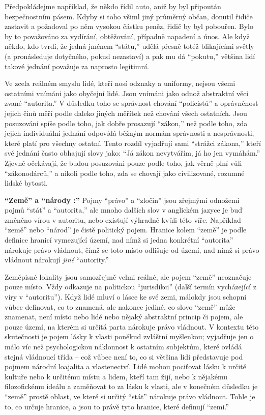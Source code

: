 \documentclass{book}
\begin{document}
Předpokládejme například, že někdo řídil auto, aniž by byl připoután bezpečnostním pásem. Kdyby si toho všiml jiný průměrný občan, donutil řidiče zastavit a požadoval po něm vysokou částku peněz, řidič by byl pobouřen. Bylo by to považováno za vydírání, obtěžování, případně napadení a únos. Ale když někdo, kdo tvrdí, že jedná jménem \enquote{státu,} udělá přesně totéž blikajícími světly (a pronásleduje dotyčného, pokud nezastaví) a pak mu dá \enquote{pokutu,} většina lidí takové jednání považuje za naprosto legitimní.

Ve zcela reálném smyslu lidé, kteří nosí odznaky a uniformy, nejsou všemi ostatními vnímáni jako obyčejní lidé. Jsou vnímáni jako odnož abstraktní věci zvané \enquote{autorita.} V důsledku toho se správnost chování \enquote{policistů} a oprávněnost jejich činů měří podle daleko jiných měřítek než chování všech ostatních. Jsou posuzováni spíše podle toho, jak dobře prosazují \enquote{zákon,} než podle toho, zda jejich individuální jednání odpovídá běžným normám správnosti a nesprávnosti, které platí pro všechny ostatní. Tento rozdíl vyjadřují sami \enquote{strážci zákona,} kteří své jednání často obhajují slovy jako: \enquote{Já zákon nevytvářím, já ho jen vymáhám.} Zjevně očekávají, že budou posuzováni pouze podle toho, jak věrně plní vůli \enquote{zákonodárců,} a nikoli podle toho, zda se chovají jako civilizované, rozumné lidské bytosti.

\textbf{\enquote{Země} a \enquote{národy :}} Pojmy \enquote{právo} a \enquote{zločin} jsou zřejmými odnožemi pojmů \enquote{stát} a \enquote{autorita,} ale mnoho dalších slov v anglickém jazyce je buď změněno vírou v autoritu, nebo existují výhradně kvůli této víře. Například \enquote{země} nebo \enquote{národ} je čistě politický pojem. Hranice kolem \enquote{země} je podle definice hranicí vymezující území, nad nímž si jedna konkrétní \enquote{autorita} nárokuje právo vládnout, čímž se toto místo odlišuje od území, nad nímž si právo vládnout nárokují \emph{jiné} \enquote{autority.}

Zeměpisné lokality jsou samozřejmě velmi reálné, ale pojem \enquote{země} neoznačuje pouze místo. Vždy odkazuje na politickou \enquote{jurisdikci} (další termín vycházející z víry v \enquote{autoritu}). Když lidé mluví o lásce ke své zemi, málokdy jsou schopni vůbec definovat, co to znamená, ale nakonec jediné, co slovo \enquote{země} může znamenat, není místo nebo lidé nebo nějaký abstraktní princip či pojem, ale pouze území, na kterém si určitá parta nárokuje právo vládnout. V kontextu této skutečnosti je pojem lásky k vlasti poněkud zvláštní myšlenkou; vyjadřuje jen o málo víc než psychologickou náklonnost k ostatním subjektům, které ovládá stejná vládnoucí třída -- což vůbec není to, co si většina lidí představuje pod pojmem národní loajalita a vlastenectví. Lidé mohou pociťovat lásku k určité kultuře nebo k určitému místu a lidem, kteří tam žijí, nebo k nějakému filozofickému ideálu a zaměňovat to za lásku k vlasti, ale v konečném důsledku je \enquote{země} prostě oblast, ve které si určitý \enquote{stát} nárokuje právo vládnout. Tohle je to, co určuje hranice, a jsou to právě tyto hranice, které definují \enquote{zemi.}
\end{document}
